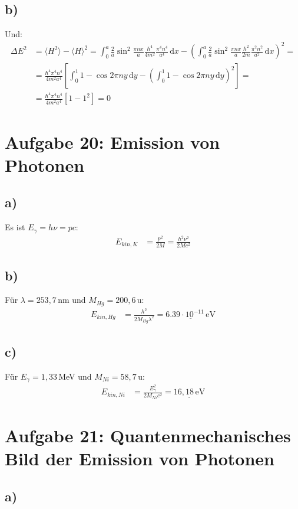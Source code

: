 \documentclass[a4paper,12pt]{article}
\newcommand{\bra}{}
\newcommand{\intx}{}
\newcommand{\kla}{}
\newcommand{\klam}{}
\begin{document}
\subsection*{b)}
Und:
\begin{align*}
\Delta E^2&=\bra\langle {H^2}\rangle-\bra\langle {H}\rangle^2=\intx\int_{0}^{a}\frac{2}{a}\sin^2\frac{\pi nx}{a}\frac{\hbar^4}{4m^2}\frac{\pi^4n^4}{a^4}\,\mathrm{d}x-\kla\left( {\intx\int_{0}^{a}\frac{2}{a}\sin^2\frac{\pi nx}{a}\frac{\hbar^2}{2m}\frac{\pi^2 n^2}{a^2}\,\mathrm{d}x} \right)^2=\\
&=\frac{\hbar^4\pi^4n^4}{4m^2a^4}\klam\left[ {\intx\int_{0}^{1}1-\cos 2\pi ny\,\mathrm{d}y-\kla\left( {\intx\int_{0}^{1}1-\cos 2\pi ny\,\mathrm{d}y} \right)^2} \right]= \\
&=\frac{\hbar^4\pi^4n^4}{4m^2a^4}\klam\left[ {1-1^2} \right]=0
\end{align*}
\section*{Aufgabe 20: Emission von Photonen}
\subsection*{a)}
Es ist $E_\gamma = h\nu =pc$:
\begin{align*}
E_{kin, K}&=\frac{p^2}{2M}=\frac{h^2\nu^2}{2Mc^2}
\end{align*}
\subsection*{b)}
Für $\lambda=253,7\,$nm und $M_{Hg}=200,6\,$u:
\begin{align*}
E_{kin, Hg}&=\frac{h^2}{2M_{Hg}\lambda^2}=\underline{6.39\cdot 10^{-11}\,\mathrm{eV}}
\end{align*}
\subsection*{c)}
Für $E_\gamma = 1,33\,$MeV und $M_{Ni}=58,7\,$u:
\begin{align*}
E_{kin, Ni}&=\frac{E_\gamma^2}{2M_{Ni}c^2}=\underline{16,18\,\mathrm{eV}}
\end{align*}
\section*{Aufgabe 21: Quantenmechanisches Bild der Emission von Photonen}
\subsection*{a)}
\end{document}
